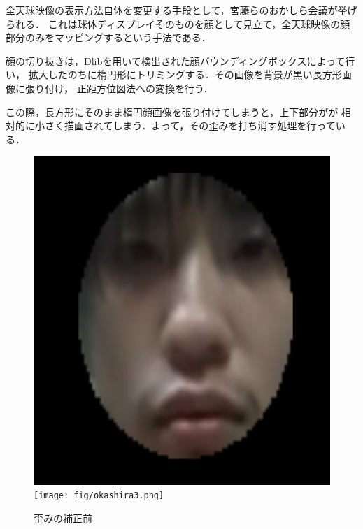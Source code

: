 全天球映像の表示方法自体を変更する手段として，宮藤ら\cite{10}のおかしら会議が挙げられる．
これは球体ディスプレイそのものを顔として見立て，全天球映像の顔部分のみをマッピングするという手法である．

顔の切り抜きは，Dlibを用いて検出された顔バウンディングボックスによって行い，
拡大したのちに楕円形にトリミングする．その画像を背景が黒い長方形画像に張り付け，
正距方位図法への変換を行う．

この際，長方形にそのまま楕円顔画像を張り付けてしまうと，上下部分がが
相対的に小さく描画されてしまう．よって，その歪みを打ち消す処理を行っている．

\begin{figure}[tp]
  \centering
  \includegraphics[scale=0.6]{fig/okashira1.png}
  \texttt{[image: fig/okashira3.png]}
  \caption{歪みの補正前}
\end{figure}

